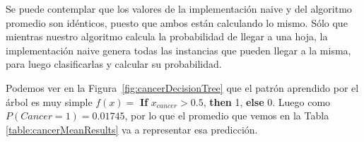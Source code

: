 Se puede contemplar que los valores de la implementación naive y del algoritmo promedio son idénticos, puesto que ambos están calculando lo mismo. Sólo que mientras nuestro algoritmo calcula la probabilidad de llegar a una hoja, la implementación naive genera todas las instancias que pueden llegar a la misma, para luego clasificarlas y calcular su probabilidad. 

Podemos ver en la Figura~\ref{fig:cancerDecisionTree} que el patrón aprendido por el árbol es muy simple $f(x) = $ \textbf{If} $x_{cancer} > 0.5$, \textbf{then} 1, \textbf{else} 0. Luego como $P(Cancer = 1) = 0.01745$, por lo que el promedio que vemos en la Tabla \ref{table:cancerMeanResults} va a representar esa predicción. 


